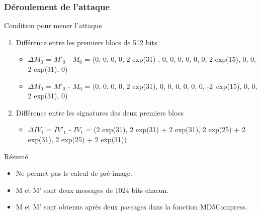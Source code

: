 	\begin{frame}
		\frametitle{D\'eroulement de l'attaque}
		\begin{block}{Condition pour mener l'attaque}
		  \begin{enumerate}
		  \item Diff\'erence entre les premiers blocs de 512 bits 
		    \begin{itemize}
		    \item $\Delta$$M_{0}$ = $M'_{0}$ - $M_{0}$ = (0, 0, 0, 0, 2 exp(31) , 0, 0, 0, 0, 0, 0, 2 exp(15), 0, 0, 2 exp(31), 0)
		    \end{itemize}
		    \begin{itemize}
		    \item $\Delta$$M_{0}$ = $M'_{0}$ - $M_{0}$ = (0, 0, 0, 0, 2 exp(31), 0, 0, 0, 0, 0, 0, -2\ exp(15), 0, 0, 2 exp(31), 0)
		    \end{itemize}
		  \item Diff\'erence entre les signatures des deux premiers blocs
		   \begin{itemize}
		   \item $\Delta$$IV_{1}$ = $IV'_{1}$ - $IV_{1}$ = (2 exp(31), 2 exp(31) + 2 exp(31), 2 exp(25) + 2 exp(31), 2 exp(25) + 2 exp(31))
		   \end{itemize}

		  \end{enumerate}
		\end{block}
	
		\begin{block}{R\'esum\'e}
		 \begin{itemize}
		 \item Ne permet pas le calcul de pr\'e-image.
		 \item M et M' sont deux messages de 1024 bits chacun.
		 \item M et M' sont obtenus apr\`es deux passages dans la fonction MD5Compress.
		\end{itemize}
		\end{block}
	\end{frame} 




